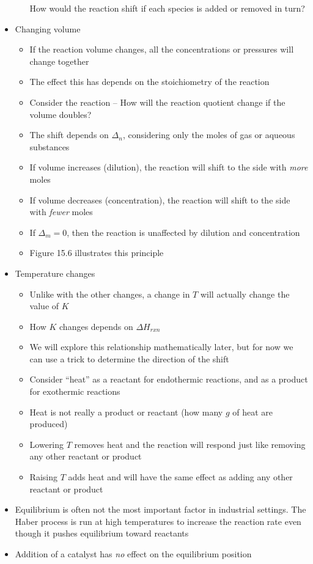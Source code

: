 \documentclass[12pt, openany, letterpaper]{memoir}
\begin{document}
\begin{itemize}
\begin{itemize}
		How would the reaction shift if each species is added or removed in turn?
	\end{itemize}
	\item Changing volume
	\begin{itemize}
		\item If the reaction volume changes, all the concentrations or pressures will change together
		\item The effect this has depends on the stoichiometry of the reaction
		\item Consider the reaction  -- How will the reaction quotient change if the volume doubles?
		\item The shift depends on $\Delta_n$, considering only the moles of gas or aqueous substances
		\item If volume increases (dilution), the reaction will shift to the side with \emph{more} moles
		\item If volume decreases (concentration), the reaction will shift to the side with \emph{fewer} moles
		\item If $\Delta_m=0$, then the reaction is unaffected by dilution and concentration
		\item Figure 15.6 illustrates this principle
	\end{itemize}
	\item Temperature changes
	\begin{itemize}
		\item Unlike with the other changes, a change in $T$ will actually change the value of $K$
		\item How $K$ changes depends on $\Delta H_{rxn}$
		\item We will explore this relationship mathematically later, but for now we can use a trick to determine the direction of the shift
		\item Consider ``heat'' as a reactant for endothermic reactions, and as a product for exothermic reactions
		\item Heat is not really a product or reactant (how many $g$ of heat are produced)
		\item Lowering $T$ removes heat and the reaction will respond just like removing any other reactant or product
		\item Raising $T$ adds heat and will have the same effect as adding any other reactant or product
	\end{itemize}
	\item Equilibrium is often not the most important factor in industrial settings. The Haber process is run at high temperatures to increase the reaction rate even though it pushes equilibrium toward reactants
	\item Addition of a catalyst has \emph{no} effect on the equilibrium position
\end{itemize}
\end{document}
